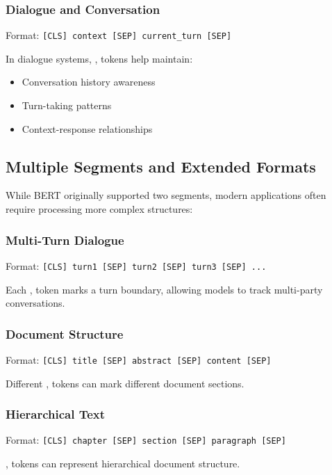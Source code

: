 \subsubsection{Dialogue and Conversation}
Format: \texttt{[CLS] context [SEP] current\_turn [SEP]}

In dialogue systems, \sep{} tokens help maintain:
\begin{itemize}
\item Conversation history awareness
\item Turn-taking patterns
\item Context-response relationships
\end{itemize}

\subsection{Multiple Segments and Extended Formats}

While BERT originally supported two segments, modern applications often require processing more complex structures:

\subsubsection{Multi-Turn Dialogue}
Format: \texttt{[CLS] turn1 [SEP] turn2 [SEP] turn3 [SEP] ...}

Each \sep{} token marks a turn boundary, allowing models to track multi-party conversations.

\subsubsection{Document Structure}
Format: \texttt{[CLS] title [SEP] abstract [SEP] content [SEP]}

Different \sep{} tokens can mark different document sections.

\subsubsection{Hierarchical Text}
Format: \texttt{[CLS] chapter [SEP] section [SEP] paragraph [SEP]}

\sep{} tokens can represent hierarchical document structure.

